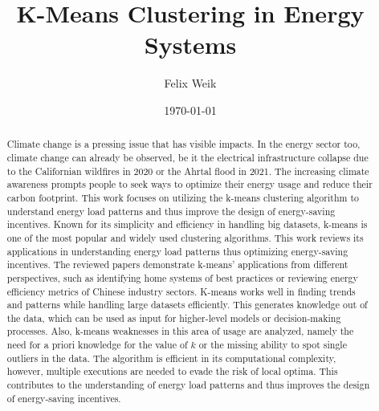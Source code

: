 \documentclass{revtex4-2}
\begin{document}
\title{K-Means Clustering in Energy Systems}
\author{Felix Weik}
\date{\today}


\begin{abstract}
Climate change is a pressing issue that has visible impacts.
In the energy sector too, climate change can already be observed, be it the electrical infrastructure collapse due to the Californian wildfires in 2020 or the Ahrtal flood in 2021.
The increasing climate awareness prompts people to seek ways to optimize their energy usage and reduce their carbon footprint.
This work focuses on utilizing the k-means clustering algorithm to understand energy load patterns and thus improve the design of energy-saving incentives.
Known for its simplicity and efficiency in handling big datasets, k-means is one of the most popular and widely used clustering algorithms.
This work reviews its applications in understanding energy load patterns thus optimizing energy-saving incentives.
The reviewed papers demonstrate k-means' applications from different perspectives, such as identifying home systems of best practices or reviewing energy efficiency metrics of Chinese industry sectors.
K-means works well in finding trends and patterns while handling large datasets efficiently.
This generates knowledge out of the data, which can be used as input for higher-level models or decision-making processes.
Also, k-means weaknesses in this area of usage are analyzed, namely the need for a priori knowledge for the value of $k$ or the missing ability to spot single outliers in the data.
The algorithm is efficient in its computational complexity, however, multiple executions are needed to evade the risk of local optima.
This contributes to the understanding of energy load patterns and thus improves the design of energy-saving incentives.
\end{abstract}

\maketitle












\clearpage

\end{document}
